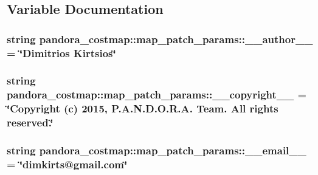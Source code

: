 \subsection{\-Variable \-Documentation}
\hypertarget{namespacepandora__costmap_1_1map__patch__params_a1abf0e0f7505b406ed5a57ca2f7ff871}{
\subsubsection[{\-\_\-\-\_\-author\-\_\-\-\_\-}]{\setlength{\rightskip}{0pt plus 5cm}string {\bf pandora\-\_\-costmap\-::map\-\_\-patch\-\_\-params\-::\-\_\-\-\_\-author\-\_\-\-\_\-} = \char`\"{}\-Dimitrios \-Kirtsios\char`\"{}}}\label{namespacepandora__costmap_1_1map__patch__params_a1abf0e0f7505b406ed5a57ca2f7ff871}
\hypertarget{namespacepandora__costmap_1_1map__patch__params_aa6b0af3d4bd88fed9f373d533b48736c}{
\subsubsection[{\-\_\-\-\_\-copyright\-\_\-\-\_\-}]{\setlength{\rightskip}{0pt plus 5cm}string {\bf pandora\-\_\-costmap\-::map\-\_\-patch\-\_\-params\-::\-\_\-\-\_\-copyright\-\_\-\-\_\-} = \char`\"{}\-Copyright (c) 2015, \-P.\-A.\-N.\-D.\-O.\-R.\-A. \-Team. \-All rights reserved.\char`\"{}}}\label{namespacepandora__costmap_1_1map__patch__params_aa6b0af3d4bd88fed9f373d533b48736c}
\hypertarget{namespacepandora__costmap_1_1map__patch__params_acbae9fb47a4292aa8c58a4cbd6f5da50}{
\subsubsection[{\-\_\-\-\_\-email\-\_\-\-\_\-}]{\setlength{\rightskip}{0pt plus 5cm}string {\bf pandora\-\_\-costmap\-::map\-\_\-patch\-\_\-params\-::\-\_\-\-\_\-email\-\_\-\-\_\-} = \char`\"{}dimkirts@gmail.\-com\char`\"{}}}\label{namespacepandora__costmap_1_1map__patch__params_acbae9fb47a4292aa8c58a4cbd6f5da50}
